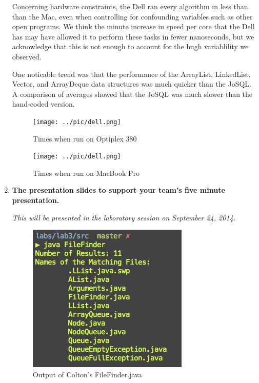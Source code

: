 \begin{enumerate}
		\medskip \par
		Concerning hardware constraints, the Dell ran every algorithm in less than than
		the Mac, even when controlling for confounding variables such as other open
		programs. We think the minute increase in speed per core that the Dell has may
		have allowed it to perform these tasks in fewer nanoseconds, but we acknowledge that
		this is not enough to account for the hugh variablility we observed. 

		\medskip \par
		One noticable trend was that the performance of the ArrayList, LinkedList, Vector, 
		and ArrayDeque data structures was much quicker than the JoSQL. A comparison of averages
		showed that the JoSQL was much slower than the hand-coded version.

		\begin{figure}[h!]                                                              
			\centerline{\texttt{[image: ../pic/dell.png]}}                       
			\caption{Times when run on Optiplex 380}
		\end{figure}          

		\newpage
		\begin{figure}[h!]                                                              
			\centerline{\texttt{[image: ../pic/dell.png]}}                       
			\caption{Times when run on MacBook Pro}
		\end{figure}          

	\item \textbf{The presentation slides to support your team's five minute
			presentation.} \par
		\textit{This will be presented in the laboratory session on September 24, 2014.}


		\newpage
		\begin{figure}[h!]                                                              
			\centerline{\includegraphics[scale=0.5]{../pic/colton.png}}                       
			\caption{Output of Colton's FileFinder.java}                                         
		\end{figure}          


\end{enumerate}
